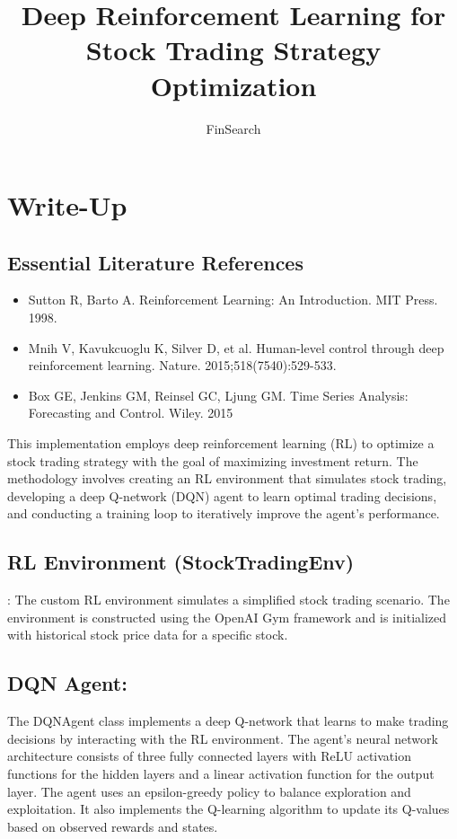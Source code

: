 \documentclass{article}
\title{Deep Reinforcement Learning for Stock Trading Strategy Optimization}
\date{FinSearch}
\begin{document}
\maketitle
\section{Write-Up}


\subsection{Essential Literature References}
\begin{itemize}
   \item Sutton R, Barto A. Reinforcement Learning: An Introduction. MIT Press. 1998.
 \item Mnih V, Kavukcuoglu K, Silver D, et al. Human-level control through deep reinforcement learning. Nature. 2015;518(7540):529-533.
 \item Box GE, Jenkins GM, Reinsel GC, Ljung GM. Time Series Analysis: Forecasting and Control. Wiley. 2015
\end{itemize}

This implementation employs deep reinforcement learning (RL) to optimize a stock trading strategy with the goal of maximizing investment return. The methodology involves creating an RL environment that simulates stock trading, developing a deep Q-network (DQN) agent to learn optimal trading decisions, and conducting a training loop to iteratively improve the agent's performance.

\subsection{RL Environment (StockTradingEnv)}:
The custom RL environment simulates a simplified stock trading scenario. The environment is constructed using the OpenAI Gym framework and is initialized with historical stock price data for a specific stock.
\subsection{DQN Agent:}
The DQNAgent class implements a deep Q-network that learns to make trading decisions by interacting with the RL environment. The agent's neural network architecture consists of three fully connected layers with ReLU activation functions for the hidden layers and a linear activation function for the output layer. The agent uses an epsilon-greedy policy to balance exploration and exploitation. It also implements the Q-learning algorithm to update its Q-values based on observed rewards and states.
\end{document}
